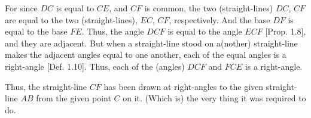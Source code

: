 \begin{Parallel}{}{}
{For since $DC$ is equal to $CE$, and $CF$ is common, the two (straight-lines) $DC$, $CF$
are equal to the two (straight-lines), $EC$, $CF$, respectively.  And the base $DF$
is equal to the base $FE$. Thus, the angle $DCF$ is equal to the
angle $ECF$ [Prop. 1.8], and they are adjacent. But when a straight-line stood on 
a(nother) straight-line makes the adjacent angles equal to one another, each of the
equal angles is a right-angle [Def. 1.10]. Thus, each of the (angles)
$DCF$ and $FCE$ is a right-angle.

Thus, the straight-line $CF$ has been drawn at right-angles to the
given straight-line $AB$ from the given point $C$ on it. (Which is) the very thing
it was required to do.}
\end{Parallel}

